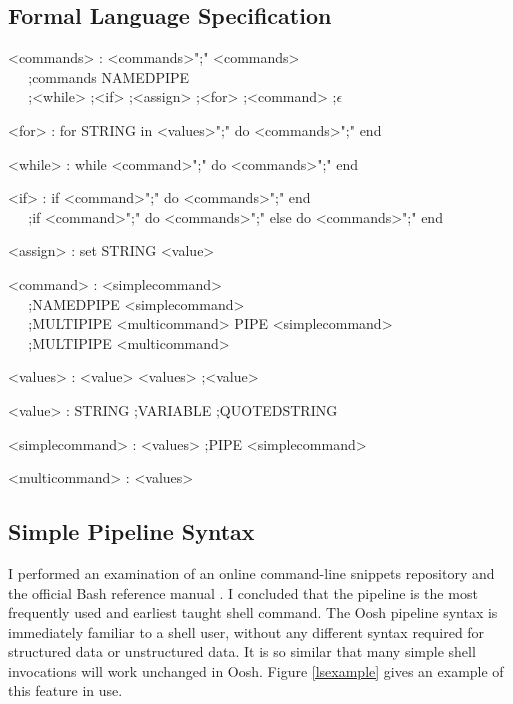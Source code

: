 \documentclass[12pt,twoside,notitlepage]{report}
\begin{document}
\subsection{Formal Language Specification}
\label{grammar}
\begin{grammar}
<commands> : <commands>";" <commands>\\
\textcolor{white}{tab};commands NAMEDPIPE\\
\textcolor{white}{tab};<while> ;<if> ;<assign> ;<for> ;<command> ;$\epsilon$

<for> : for STRING in <values>";" do <commands>";" end

<while> : while <command>";" do <commands>";" end

<if> : if <command>";" do <commands>";" end\\
\textcolor{white}{tab};if <command>";" do <commands>";" else do <commands>";" end

<assign> : set STRING <value>

<command> : <simplecommand>\\
\textcolor{white}{tab};NAMEDPIPE <simplecommand>\\
\textcolor{white}{tab};MULTIPIPE <multicommand> PIPE <simplecommand>\\
\textcolor{white}{tab};MULTIPIPE <multicommand>

<values> : <value> <values> ;<value>

<value> : STRING ;VARIABLE ;QUOTEDSTRING

<simplecommand> : <values>
;PIPE <simplecommand>
    
<multicommand> : <values>
\end{grammar}

\subsection{Simple Pipeline Syntax}

I performed an examination of an online command-line snippets
repository \cite{clifu} and the official Bash reference manual
\cite{bashman}. I concluded that the pipeline is the most frequently
used and earliest taught shell command. The Oosh pipeline syntax is
immediately familiar to a shell user, without any different syntax
required for structured data or unstructured data. It is so similar
that many simple shell invocations will work unchanged in Oosh. Figure
\ref{lsexample} gives an example of this feature in use.
\end{document}
